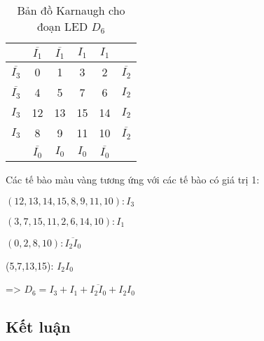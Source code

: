 \begin{table}[H]
	\centering
	\begin{tabular}{|c|c|c|c|c|c|}
		\hline
		                   & \(\overline{I_1}\)   & \(\overline{I_1}\)   & \(I_1\)              & \(I_1\)              &                    \\
		\hline
		\(\overline{I_3}\) & \cellcolor{yellow}0  & 1                    & \cellcolor{yellow}3  & 2                    & \(\overline{I_2}\) \\
		\hline
		\(\overline{I_3}\) & 4                    & \cellcolor{yellow}5  & 7                    & \cellcolor{yellow}6  & \(I_2\)            \\
		\hline
		\(I_3\)            & \cellcolor{yellow}12 & \cellcolor{yellow}13 & \cellcolor{yellow}15 & \cellcolor{yellow}14 & \(I_2\)            \\
		\hline
		\(I_3\)            & \cellcolor{yellow}8  & \cellcolor{yellow}9  & \cellcolor{yellow}11 & \cellcolor{yellow}10 & \(\overline{I_2}\) \\
		\hline
		                   & \(\overline{I_0}\)   & \(I_0\)              & \(I_0\)              & \(\overline{I_0}\)   &                    \\
		\hline
	\end{tabular}
	\caption*{Bản đồ Karnaugh cho đoạn LED \(D_6\)}

\end{table}

Các tế bào màu vàng tương ứng với các tế bào có giá trị 1:

\((12,13,14,15,8,9,11,10): I_3\)

\((3,7,15,11,2,6,14,10): I_1\)

\((0,2,8,10): \overline{I_2 I_0} \)

(5,7,13,15): \(I_2 I_0\)

=> \(D_6 = I_3 + I_1 + \overline{I_2 I_0} + I_2 I_0\)

\subsection{Kết luận}

